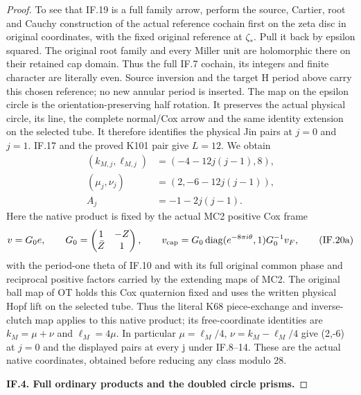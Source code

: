 \begin{proof}
To see that IF.19 is a full family arrow, perform the source, Cartier,
root and Cauchy construction of the actual reference cochain first
on the zeta disc in original coordinates, with the fixed original
reference at \(\zeta_*\).  Pull it back by epsilon squared.  The original
root family and every Miller unit are holomorphic there on their
retained cap domain.  Thus the full IF.7 cochain, its integers and
finite character are literally even.  Source inversion and the target
H period above carry this chosen reference; no new annular period is
inserted.  The map on the epsilon circle is the orientation-preserving
half rotation.  It preserves the actual physical circle, its line,
the complete normal/Cox arrow and the same identity extension on the
selected tube.  It therefore identifies the physical Jin pairs at
\(j=0\) and \(j=1\).  IF.17 and the proved K101 pair give \(L=12\).  We obtain
\[
 \begin{split}
 (k_{M,j},\ell_{M,j})&=(-4-12j(j-1),8),\\
 (\mu_j,\nu_j)&=(2,-6-12j(j-1)),\\
 A_j&=-1-2j(j-1).
 \end{split}
 \tag{IF.20}
\]
Here the native product is fixed by the actual MC2 positive Cox frame
\[
 v=G_0e,\qquad G_0=\begin{pmatrix}1&-Z\\ \bar Z&1\end{pmatrix},\qquad
 v_{\rm cap}=G_0\operatorname{diag}(e^{-8\pi i\theta},1)G_0^{-1}v_F,
 \tag{IF.20a}
\]
with the period-one theta of IF.10 and with its full original common
phase and reciprocal positive factors carried by the extending maps
of MC2.  The original ball map of OT holds this Cox quaternion fixed
and uses the written physical Hopf lift on the selected tube.  Thus
the literal K68 piece-exchange and inverse-clutch map applies to this
native product; its free-coordinate identities are
\(k_M=\mu+\nu\) and \(\ell_M=4\mu\).  In particular
\(\mu=\ell_M/4\), \(\nu=k_M-\ell_M/4\) give (2,-6)
at \(j=0\) and the displayed pairs at every j under IF.8--14.  These are
the actual native coordinates, obtained before reducing any class
modulo 28.

\par\medskip\noindent\textbf{IF.4. Full ordinary products and the doubled circle prisms.}\par\nopagebreak[4]


\end{proof}
